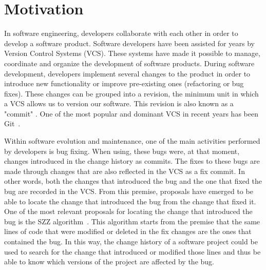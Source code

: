 \section{Motivation}

In software engineering, developers collaborate with each other in order to develop a software product. 
Software developers have been assisted for years by Version Control Systems (VCS). 
These systems have made it possible to manage, coordinate and organize the development of software products. 
During software development, developers implement several changes to the product in order to introduce new functionality or improve pre-existing ones (refactoring or bug fixes).  
These changes can be grouped into a revision, the minimum unit in which a VCS allows us to version our software. This revision is also known as a "commit" . 
One of the most popular and dominant VCS in recent years has been Git~\cite{VersionControlSystemSurvey:2022:Online}. 

Within software evolution and maintenance, one of the main activities performed by developers is bug fixing. 
When using, these bugs were, at that moment, changes introduced in the change history as commits. 
The fixes to these bugs are made through changes that are also reflected in the VCS as a fix commit. 
In other words, both the changes that introduced the bug and the one that fixed the bug are recorded in the VCS. 
From this premise, proposals have emerged to be able to locate the change that introduced the bug from the change that fixed it. 
One of the most relevant proposals for locating the change that introduced the bug is the SZZ algorithm~\cite{Sliwerski:2005:CIF:1083142.1083147}. 
This algorithm starts from the premise  that the same lines of code that were modified or deleted in the fix changes are the ones that contained the bug. 
In this way, the change history of a software project could be used to search for the change that introduced or modified those lines and thus be able to know which versions of the project are affected by the bug.

